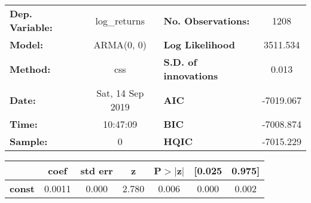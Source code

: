 \begin{center}
\begin{tabular}{lclc}
\toprule
\textbf{Dep. Variable:} &   log\_returns   & \textbf{  No. Observations:  } &    1208     \\
\textbf{Model:}         &    ARMA(0, 0)    & \textbf{  Log Likelihood     } &  3511.534   \\
\textbf{Method:}        &       css        & \textbf{  S.D. of innovations} &   0.013     \\
\textbf{Date:}          & Sat, 14 Sep 2019 & \textbf{  AIC                } & -7019.067   \\
\textbf{Time:}          &     10:47:09     & \textbf{  BIC                } & -7008.874   \\
\textbf{Sample:}        &        0         & \textbf{  HQIC               } & -7015.229   \\
\bottomrule
\end{tabular}
\begin{tabular}{lcccccc}
               & \textbf{coef} & \textbf{std err} & \textbf{z} & \textbf{P$> |$z$|$} & \textbf{[0.025} & \textbf{0.975]}  \\
\midrule
\textbf{const} &       0.0011  &        0.000     &     2.780  &         0.006        &        0.000    &        0.002     \\
\bottomrule
\end{tabular}
\end{center}
